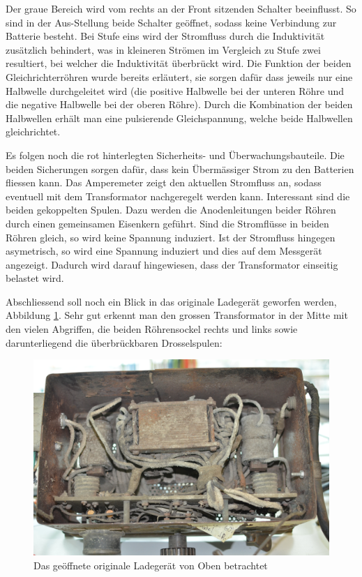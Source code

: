 Der graue Bereich wird vom rechts an der Front sitzenden Schalter beeinflusst. So sind in der Aus-Stellung beide Schalter geöffnet, sodass keine Verbindung zur Batterie besteht. Bei Stufe eins wird der Stromfluss durch die Induktivität zusätzlich behindert, was in kleineren Strömen im Vergleich zu Stufe zwei resultiert, bei welcher die Induktivität überbrückt wird. Die Funktion der beiden Gleichrichterröhren wurde bereits erläutert, sie sorgen dafür dass jeweils nur eine Halbwelle durchgeleitet wird (die positive Halbwelle bei der unteren Röhre und die negative Halbwelle bei der oberen Röhre). Durch die Kombination der beiden Halbwellen erhält man eine pulsierende Gleichspannung, welche beide Halbwellen gleichrichtet.

Es folgen noch die rot hinterlegten Sicherheits- und Überwachungsbauteile. Die beiden Sicherungen sorgen dafür, dass kein Übermässiger Strom zu den Batterien fliessen kann. Das Amperemeter zeigt den aktuellen Stromfluss an, sodass eventuell mit dem Transformator nachgeregelt werden kann. Interessant sind die beiden gekoppelten Spulen. Dazu werden die Anodenleitungen beider Röhren durch einen gemeinsamen Eisenkern geführt. Sind die Stromflüsse in beiden Röhren gleich, so wird keine Spannung induziert. Ist der Stromfluss hingegen asymetrisch, so wird eine Spannung induziert und dies auf dem Messgerät angezeigt. Dadurch wird darauf hingewiesen, dass der Transformator einseitig belastet wird.

Abschliessend soll noch ein Blick in das originale Ladegerät geworfen werden, Abbildung \ref{fig:Ladegeraet_Original}. Sehr gut erkennt man den grossen Transformator in der Mitte mit den vielen Abgriffen, die beiden Röhrensockel rechts und links sowie darunterliegend die überbrückbaren Drosselspulen:

\begin{figure}[h]
	\centering
		\includegraphics[width=1.0\textwidth]{images/Ladegeraet_Original.JPG}
	\caption{Das geöffnete originale Ladegerät von Oben betrachtet}
	\label{fig:Ladegeraet_Original}
\end{figure}

\newpage